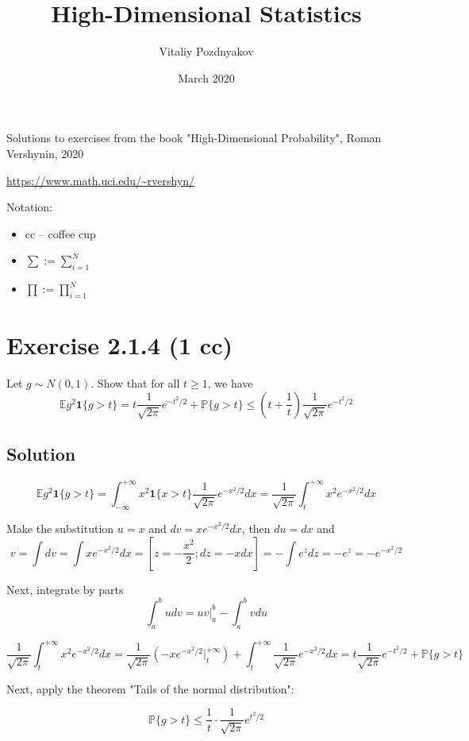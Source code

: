 \documentclass{article}
\author{Vitaliy Pozdnyakov}
\title{High-Dimensional Statistics}
\date{March 2020}
\begin{document}
\maketitle

Solutions to exercises from the book "High-Dimensional Probability", Roman Vershynin, 2020

\url{https://www.math.uci.edu/~rvershyn/}

\bigskip

Notation:
\begin{itemize}
    \item cc -- coffee cup
    \item $\sum := \sum_{i=1}^N$
    \item $\prod := \prod_{i=1}^N$
\end{itemize}

\section{Exercise 2.1.4 (1 cc)}

Let $g \sim N(0, 1)$. Show that for all $t \geq 1$, we have
$$\mathbb E g^2 \mathbf 1\{g>t\} = t \frac{1}{\sqrt{2 \pi}}e^{-{t^2}/{2}} + \mathbb P\{g>t\} \leq \left(t+\frac{1}{t}\right)\frac{1}{\sqrt{2 \pi}}e^{-{t^2}/{2}}$$

\subsection{Solution}
$$\mathbb E g^2 \mathbf 1\{g>t\} 
= \int_{-\infty}^{+\infty}x^2 \mathbf 1\{x>t\} \frac{1}{\sqrt{2 \pi}}e^{-{x^2}/{2}}dx 
= \frac{1}{\sqrt{2 \pi}} \int_{t}^{+\infty}x^2 e^{-{x^2}/{2}}dx$$

Make the substitution $u = x$ and $dv = xe^{-{x^2}/{2}}dx$, then $du = dx$ and $$v = \int dv = \int xe^{-{x^2}/{2}}dx = \left[z = -\frac{x^2}{2}; dz = -xdx\right] = - \int e^z dz = - e^z = - e^{-{x^2}/{2}}$$

Next, integrate by parts $$\int_a^b udv = uv\Big|_a^b - \int_a^b vdu$$

$$\frac{1}{\sqrt{2 \pi}} \int_{t}^{+\infty}x^2 e^{-{x^2}/{2}}dx 
= \frac{1}{\sqrt{2 \pi}}\left(-xe^{-{x^2}/{2}}\Big|_t^{+\infty}\right) + \int_{t}^{+\infty}\frac{1}{\sqrt{2 \pi}}e^{-{x^2}/{2}} dx 
= t \frac{1}{\sqrt{2 \pi}}e^{-{t^2}/{2}} + \mathbb P\{g>t\}$$

Next, apply the theorem "Tails of the normal distribution":

$$\mathbb P\{g>t\} \leq \frac{1}{t}\cdot \frac{1}{\sqrt{2 \pi}}e^{t^2/2}$$
\end{document}
